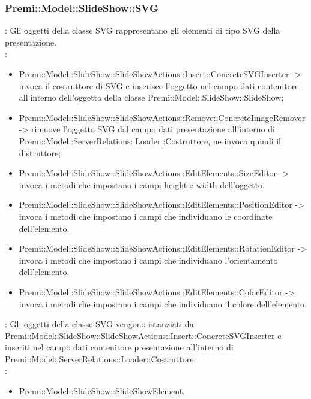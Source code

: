 {                    \subsubsection{Premi::Model::SlideShow::SVG}{
				\textbf{\tipo}: Gli oggetti della classe SVG rappresentano gli elementi di tipo SVG della presentazione.\\
				\textbf{\relaz}: 
				\begin{itemize}
					\item Premi::Model::SlideShow::SlideShowActions::Insert::ConcreteSVGInserter -> invoca il costruttore di SVG e inserisce l’oggetto nel campo dati contenitore all’interno dell’oggetto della classe Premi::Model::SlideShow::SlideShow;
                    \item Premi::Model::SlideShow::SlideShowActions::Remove::ConcreteImageRemover -> rimuove l’oggetto SVG dal campo dati presentazione all’interno di Premi::Model::ServerRelations::Loader::Costruttore, ne invoca quindi il distruttore;
                    \item Premi::Model::SlideShow::SlideShowActions::EditElements::SizeEditor -> invoca i metodi che impostano i campi height e width dell'oggetto.
                    \item Premi::Model::SlideShow::SlideShowActions::EditElements::PositionEditor -> invoca i metodi che impostano i campi che individuano le coordinate dell'elemento.
                    \item Premi::Model::SlideShow::SlideShowActions::EditElements::RotationEditor -> invoca i metodi che impostano i campi che individuano l'orientamento dell'elemento.
                    \item Premi::Model::SlideShow::SlideShowActions::EditElements::ColorEditor -> invoca i metodi che impostano i campi che individuano il colore dell'elemento.
				\end{itemize}	
                \textbf{\interfacce}: Gli oggetti della classe SVG vengono istanziati da Premi::Model::SlideShow::SlideShowActions::Insert::ConcreteSVGInserter e inseriti nel campo dati contenitore presentazione all’interno di Premi::Model::ServerRelations::Loader::Costruttore.\\
                \textbf{\base}: 
                    \begin{itemize}
                    \item Premi::Model::SlideShow::SlideShowElement.
                    \end{itemize}
                    }
}
